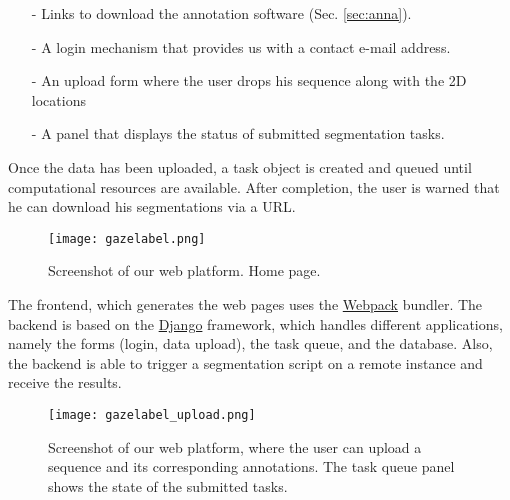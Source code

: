 \begin{itemize}
  \item[-]{Links to download the annotation software (Sec. \ref{sec:anna}).}
  \item[-]{A login mechanism that provides us with a contact e-mail address.}
  \item[-]{An upload form where the user drops his sequence along with the 2D locations}
  \item[-]{A panel that displays the status of submitted segmentation tasks.}
\end{itemize}

Once the data has been uploaded, a task object is created and queued until computational resources are available.
After completion, the user is warned that he can download his segmentations via a URL.

\begin{figure}[!htpb]
  \texttt{[image: gazelabel.png]}
  \caption{Screenshot of our web platform. Home page.}
  \label{fig:homepage}
\end{figure}

The frontend, which generates the web pages uses the \href{https://webpack.js.org}{Webpack} bundler.
The backend is based on the \href{https://www.djangoproject.com/}{Django} framework, which handles different applications, namely the forms (login, data upload), the task queue, and the database.
Also, the backend is able to trigger a segmentation script on a remote instance and receive the results.

\begin{figure}[!htpb]
  \texttt{[image: gazelabel\_upload.png]}
  \caption{Screenshot of our web platform, where the user can upload a sequence and its corresponding annotations. The task queue panel shows the state of the submitted tasks.}
  \label{fig:upload}
\end{figure}

